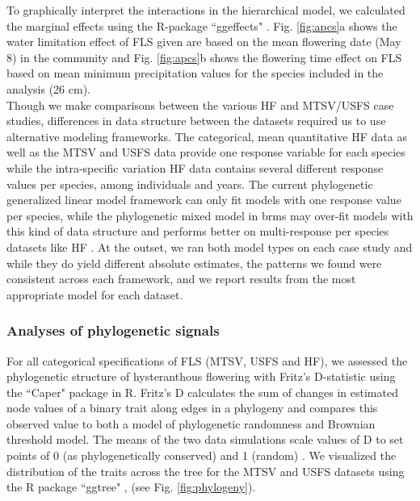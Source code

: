 \documentclass[11pt]{article}
\begin{document}
{  %
  \indent To graphically interpret the interactions in the hierarchical model, we calculated the marginal effects using the R-package ``ggeffects" \citep{Ludecke2018}. Fig. \ref{fig:apcs}a shows the water limitation effect of FLS given are based on the mean flowering date (May 8) in the community and  Fig. \ref{fig:apcs}b shows the flowering time effect on FLS based on mean minimum precipitation values for the species included in the analysis (26 cm). \\
  
  \noindent Though we make comparisons between the various HF and MTSV/USFS case studies, differences in data structure between the datasets required us to use alternative modeling frameworks. The categorical, mean quantitative HF data as well as the MTSV and USFS data provide one response variable for each species while the intra-specific variation HF data contains several different response values per species, among individuals and years. The current phylogenetic generalized linear model framework can only fit models with one response value per species, while the phylogenetic mixed model in brms may over-fit models with this kind of data structure and performs better on multi-response per species datasets like HF \citep{BurknerPC}. At the outset, we ran both model types on each case study and while they do yield different absolute estimates, the patterns we found were consistent across each framework, and we report results from the most appropriate model for each dataset.\\
  
  \subsubsection*{Analyses of phylogenetic signals}
  \noindent For all categorical specifications of FLS (MTSV, USFS and HF), we assessed the phylogenetic structure of hysteranthous flowering with Fritz's D-statistic \citep{FRITZ2010} using the ``Caper" package \citep{Orme2013} in R. Fritz's D calculates the sum of changes in estimated node values of a binary trait along edges in a phylogeny and compares this observed value to both a model of phylogenetic randomness and Brownian threshold model. The means of the two data simulations scale values of D to set points of 0 (as phylogenetically conserved) and 1 (random)  \citep{Orme2013}. We visualized the distribution of the traits across the tree for the MTSV and USFS datasets using the R package ``ggtree" \citep{Yu2017}, (see Fig. \ref{fig:phylogeny}). \\
  
}
\end{document}
